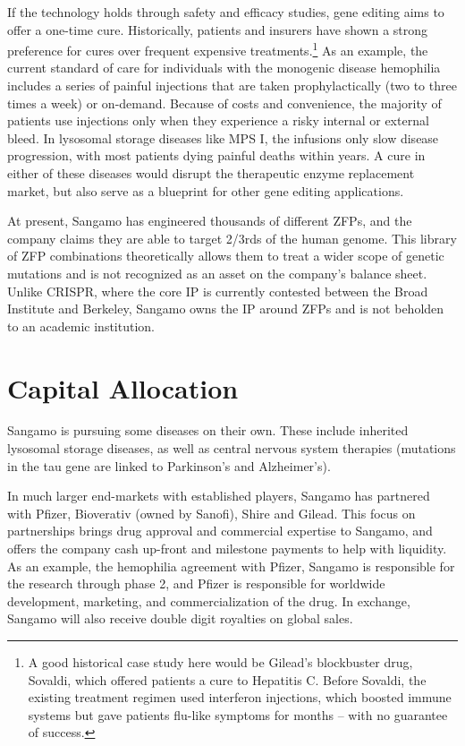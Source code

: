 \documentclass{article} %
\begin{document}
If the technology holds through safety and efficacy studies, gene editing aims to offer a one-time cure. Historically, patients and insurers have shown a strong preference for cures over frequent expensive treatments.\footnote{A good historical case study here would be Gilead's blockbuster drug, Sovaldi, which offered patients a cure to Hepatitis C. Before Sovaldi, the existing treatment regimen used interferon injections, which boosted immune systems but gave patients flu-like symptoms for months -- with no guarantee of success.} As an example, the current standard of care for individuals with the monogenic disease hemophilia includes a series of painful injections that are taken prophylactically (two to three times a week) or on-demand. Because of costs and convenience, the majority of patients use injections only when they experience a risky internal or external bleed. In lysosomal storage diseases like MPS I, the infusions only slow disease progression, with most patients dying painful deaths within years. A cure in either of these diseases would disrupt the therapeutic enzyme replacement market, but also serve as a blueprint for other gene editing applications. 

At present, Sangamo has engineered thousands of different ZFPs, and the company claims they are able to target 2/3rds of the human genome. This library of ZFP combinations theoretically allows them to treat a wider scope of genetic mutations and is not recognized as an asset on the company's balance sheet. Unlike CRISPR, where the core IP is currently contested between the Broad Institute and Berkeley, Sangamo owns the IP around ZFPs and is not beholden to an academic institution.

\section{Capital Allocation}

Sangamo is pursuing some diseases on their own. These include inherited lysosomal storage diseases, as well as central nervous system therapies (mutations in the tau gene are linked to Parkinson's and Alzheimer's). 

In much larger end-markets with established players, Sangamo has partnered with Pfizer, Bioverativ (owned by Sanofi), Shire and Gilead. This focus on partnerships brings drug approval and commercial expertise to Sangamo, and offers the company cash up-front and milestone payments to help with liquidity. As an example, the hemophilia agreement with Pfizer, Sangamo is responsible for the research through phase 2, and Pfizer is responsible for worldwide development, marketing, and commercialization of the drug. In exchange, Sangamo will also receive double digit royalties on global sales. 
\end{document}
